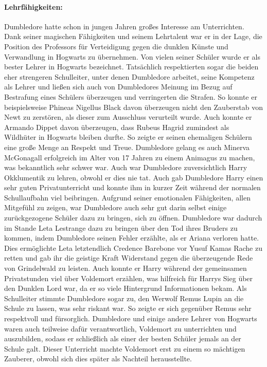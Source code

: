\documentclass[a4paper, 10pt]{article}
\begin{document}
\paragraph{Lehrfähigkeiten:}
Dumbledore hatte schon in jungen Jahren großes Interesse am Unterrichten. Dank seiner magischen Fähigkeiten und seinem Lehrtalent war er in der Lage, die Position des Professors für Verteidigung gegen die dunklen Künste und Verwandlung in Hogwarts zu übernehmen. Von vielen seiner Schüler wurde er als bester Lehrer in Hogwarts bezeichnet. Tatsächlich respektierten sogar die beiden eher strengeren Schulleiter, unter denen Dumbledore arbeitet, seine Kompetenz als Lehrer und ließen sich auch von Dumbledores Meinung im Bezug auf Bestrafung eines Schülers überzeugen und verringerten die Strafen. So konnte er beispielsweise Phineas Nigellus Black davon überzeugen nicht den Zauberstab von Newt zu zerstören, als dieser zum Ausschluss verurteilt wurde. Auch konnte er Armando Dippet davon überzeugen, dass Rubeus Hagrid zumindest als Wildhüter in Hogwarts bleiben durfte. So zeigte er seinen ehemaligen Schülern eine große Menge an Respekt und Treue. Dumbledore gelang es auch Minerva McGonagall erfolgreich im Alter von 17 Jahren zu einem Animagus zu machen, was bekanntlich sehr schwer war. Auch war Dumbledore zuversichtlich Harry Okklumentik zu lehren, obwohl er dies nie tat. Auch gab Dumbledore Harry einen sehr guten Privatunterricht und konnte ihm in kurzer Zeit während der normalen Schullaufbahn viel beibringen. Aufgrund seiner emotionalen Fähigkeiten, allen Mitgefühl zu zeigen, war Dumbledore auch sehr gut darin selbst einige zurückgezogene Schüler dazu zu bringen, sich zu öffnen. Dumbledore war dadurch im Stande Leta Lestrange dazu zu bringen über den Tod ihres Bruders zu kommen, indem Dumbledore seinen Fehler erzählte, als er Ariana verloren hatte. Dies ermöglichte Leta letztendlich Credence Barebone vor Yusuf Kamas Rache zu retten und gab ihr die geistige Kraft Widerstand gegen die überzeugende Rede von Grindelwald zu leisten. Auch konnte er Harry während der gemeinsamen Privatstunden viel über Voldemort erzählen, was hilfreich für Harrys Sieg über den Dunklen Lord war, da er so viele Hintergrund Informationen bekam. Als Schulleiter stimmte Dumbledore sogar zu, den Werwolf Remus Lupin an die Schule zu lassen, was sehr riskant war. So zeigte er sich gegenüber Remus sehr respektvoll und fürsorglich. Dumbledore und einige andere Lehrer von Hogwarts waren auch teilweise dafür verantwortlich, Voldemort zu unterrichten und auszubilden, sodass er schließlich als einer der besten Schüler jemals an der Schule galt. Dieser Unterricht machte Voldemort erst zu einem so mächtigen Zauberer, obwohl sich dies später als Nachteil herausstellte.
\end{document}
